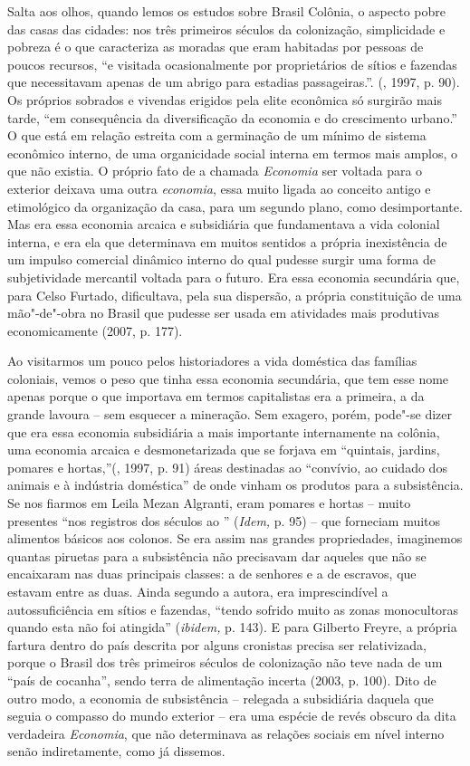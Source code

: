 {Salta aos olhos, quando lemos os estudos sobre Brasil Colônia, o aspecto
pobre das casas das cidades: nos três primeiros séculos da colonização,
simplicidade e pobreza é o que caracteriza as moradas que eram habitadas
por pessoas de poucos recursos, ``e visitada ocasionalmente por
proprietários de sítios e fazendas que necessitavam apenas de um abrigo
para estadias passageiras.''. (, 1997, p. 90). Os próprios
sobrados e vivendas erigidos pela elite econômica só surgirão mais
tarde, ``em consequência da diversificação da economia e do crescimento
urbano.'' O que está em relação estreita com a germinação de um mínimo
de sistema econômico interno, de uma organicidade social interna em
termos mais amplos, o que não existia. O próprio fato de a chamada
\emph{Economia} ser voltada para o exterior deixava uma outra
\emph{economia}, essa muito ligada ao conceito antigo e etimológico da
organização da casa, para um segundo plano, como desimportante. Mas era
essa economia arcaica e subsidiária que fundamentava a vida colonial
interna, e era ela que determinava em muitos sentidos a própria
inexistência de um impulso comercial dinâmico interno do qual pudesse
surgir uma forma de subjetividade mercantil voltada para o futuro. Era
essa economia secundária que, para Celso Furtado, dificultava, pela sua
dispersão, a própria constituição de uma mão"-de"-obra no Brasil que
pudesse ser usada em atividades mais produtivas economicamente (2007, p.
177).

Ao visitarmos um pouco pelos historiadores a vida doméstica das famílias
coloniais, vemos o peso que tinha essa economia secundária, que tem esse
nome apenas porque o que importava em termos capitalistas era a
primeira, a da grande lavoura -- sem esquecer a mineração. Sem exagero,
porém, pode"-se dizer que era essa economia subsidiária a mais importante
internamente na colônia, uma economia arcaica e desmonetarizada que se
forjava em ``quintais, jardins, pomares e hortas,''(, 1997, p.
91) áreas destinadas ao ``convívio, ao cuidado dos animais e à indústria
doméstica'' de onde vinham os produtos para a subsistência. Se nos
fiarmos em Leila Mezan Algranti, eram pomares e hortas -- muito
presentes ``nos registros dos séculos  ao '' (\emph{Idem,} p. 95)
-- que forneciam muitos alimentos básicos aos colonos. Se era assim nas
grandes propriedades, imaginemos quantas piruetas para a subsistência
não precisavam dar aqueles que não se encaixaram nas duas principais
classes: a de senhores e a de escravos, que estavam entre as duas. Ainda
segundo a autora, era imprescindível a autossuficiência em sítios e
fazendas, ``tendo sofrido muito as zonas monocultoras quando esta não
foi atingida'' (\emph{ibidem,} p. 143). E para Gilberto Freyre, a
própria fartura dentro do país descrita por alguns cronistas precisa ser
relativizada, porque o Brasil dos três primeiros séculos de colonização
não teve nada de um ``país de cocanha'', sendo terra de alimentação
incerta (2003, p. 100). Dito de outro modo, a economia de subsistência
-- relegada a subsidiária daquela que seguia o compasso do mundo
exterior -- era uma espécie de revés obscuro da dita verdadeira
\emph{Economia}, que não determinava as relações sociais em nível
interno senão indiretamente, como já dissemos.

}
